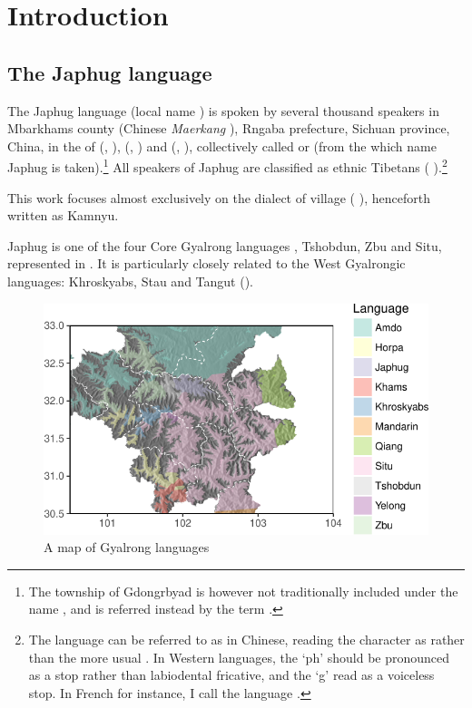 \chapter{Introduction}

\section{The Japhug language}
The Japhug language (local name ) is spoken by several thousand speakers in Mbarkhams county (Chinese \textit{Maerkang} ), Rngaba prefecture, Sichuan province, China, in the  of  (,  ),  (,  ) and  (,  ), collectively called  or  (from the which name Japhug is taken).\footnote{The township of Gdongrbyad is however not traditionally included under the name , and is referred instead by the term . }  All speakers of Japhug are classified as ethnic Tibetans ( ).\footnote{The language can be referred to as   in Chinese, reading the character  as   rather than the more usual . In Western languages, the `ph' should be pronounced as a stop rather than labiodental fricative, and the `g' read as a voiceless stop. In French for instance, I call the language . }

This work focuses almost exclusively on the dialect of  village ( ), henceforth written as Kamnyu.
  
Japhug is one of the four Core Gyalrong languages \citep{jackson00sidaba}, Tshobdun, Zbu and Situ, represented in . It is particularly closely related to the West Gyalrongic languages: Khroskyabs, Stau  and Tangut (\citealt{jackson00puxi, jacques17stau}).
    
 \begin{figure}
\caption{A map of Gyalrong languages} \label{fig:map.rgyalrong}
\includegraphics[width=\textwidth]{carte3.pdf}
\end{figure}

